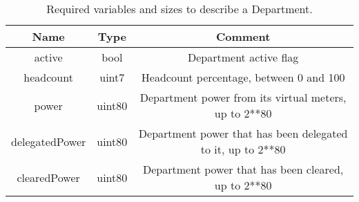 \begin{table}[H]
	\centering
	\vspace*{-1ex}
	\scriptsize
	\vspace{-1ex}
	\caption{Required variables and sizes to describe a Department.}
	\begin{tabular}{|c|c|c|}
        \hline
        \textbf{Name} & \textbf{Type}  & \textbf{Comment}\\ \hline 
        active         & bool         & Department active flag\\
        headcount      & uint7        & Headcount percentage, between 0 and 100\\
        power          & uint80       & Department power from its virtual meters, up to 2**80\\
        delegatedPower & uint80       & Department power that has been delegated to it, up to 2**80\\
        clearedPower   & uint80       & Department power that has been cleared, up to 2**80 \\
        \hline
    \end{tabular}
    \label{table:department}
\end{table}